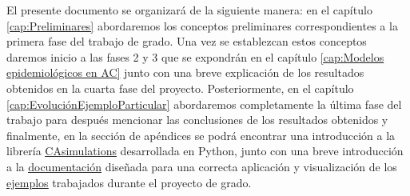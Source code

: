 El presente documento se organizará de la siguiente manera: en el capítulo \ref{cap:Preliminares} abordaremos los conceptos preliminares correspondientes a la primera fase del trabajo de grado. Una vez se establezcan estos conceptos daremos inicio a las fases 2 y 3 que se expondrán en el capítulo \ref{cap:Modelos epidemiológicos en AC} junto con una breve explicación de los resultados obtenidos en la cuarta fase del proyecto. Posteriormente, en el capítulo \ref{cap:EvoluciónEjemploParticular} abordaremos completamente la última fase del trabajo para después mencionar las conclusiones de los resultados obtenidos y finalmente, en la sección de apéndices se podrá encontrar una introducción a la librería \href{https://github.com/Grupo-de-simulacion-con-automatas/Prediccion-del-comportamiento-de-una-enfermedad-simulada-en-AC-con-un-algoritmo-en-RN}{\underline{CAsimulations}} desarrollada en Python, junto con una breve introducción a la \href{https://grupo-de-simulacion-con-automatas.github.io/CAsimulations-Modelacion-de-dinamicas-topologicas-en-la-propagacion-de-una-enfermedad-usando-CA/}{\underline{documentación}} diseñada para una correcta aplicación y visualización de los \href{https://github.com/Grupo-de-simulacion-con-automatas/Prediccion-del-comportamiento-de-una-enfermedad-simulada-en-AC-con-un-algoritmo-en-RN/tree/master/Codigo}{\underline{ejemplos}} trabajados durante el proyecto de grado.
